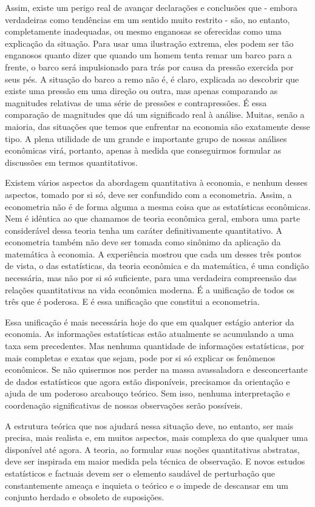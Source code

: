 \documentclass[12pt]{article}
\begin{document}
Assim, existe um perigo real de avançar declarações e conclusões que - embora verdadeiras como tendências em um sentido muito restrito - são, no entanto, completamente inadequadas, ou mesmo enganosas se oferecidas como uma explicação da situação. Para usar uma ilustração extrema, eles podem ser tão enganosos quanto dizer que quando um homem tenta remar um barco para a frente, o barco será impulsionado para trás por causa da pressão exercida por seus pés. A situação do barco a remo não é, é claro, explicada ao descobrir que existe uma pressão em uma direção ou outra, mas apenas comparando as magnitudes relativas de uma série de pressões e contrapressões. É essa comparação de magnitudes que dá um significado real à análise. Muitas, senão a maioria, das situações que temos que enfrentar na economia são exatamente desse tipo. A plena utilidade de um grande e importante grupo de nossas análises econômicas virá, portanto, apenas à medida que conseguirmos formular as discussões em termos quantitativos.

Existem vários aspectos da abordagem quantitativa à economia, e nenhum desses aspectos, tomado por si só, deve ser confundido com a econometria. Assim, a econometria não é de forma alguma a mesma coisa que as estatísticas econômicas. Nem é idêntica ao que chamamos de teoria econômica geral, embora uma parte considerável dessa teoria tenha um caráter definitivamente quantitativo. A econometria também não deve ser tomada como sinônimo da aplicação da matemática à economia. A experiência mostrou que cada um desses três pontos de vista, o das estatísticas, da teoria econômica e da matemática, é uma condição necessária, mas não por si só suficiente, para uma verdadeira compreensão das relações quantitativas na vida econômica moderna. É a unificação de todos os três que é poderosa. E é essa unificação que constitui a econometria.

Essa unificação é mais necessária hoje do que em qualquer estágio anterior da economia. As informações estatísticas estão atualmente se acumulando a uma taxa sem precedentes. Mas nenhuma quantidade de informações estatísticas, por mais completas e exatas que sejam, pode por si só explicar os fenômenos econômicos. Se não quisermos nos perder na massa avassaladora e desconcertante de dados estatísticos que agora estão disponíveis, precisamos da orientação e ajuda de um poderoso arcabouço teórico. Sem isso, nenhuma interpretação e coordenação significativas de nossas observações serão possíveis.

A estrutura teórica que nos ajudará nessa situação deve, no entanto, ser mais precisa, mais realista e, em muitos aspectos, mais complexa do que qualquer uma disponível até agora. A teoria, ao formular suas noções quantitativas abstratas, deve ser inspirada em maior medida pela técnica de observação. E novos estudos estatísticos e factuais devem ser o elemento saudável de perturbação que constantemente ameaça e inquieta o teórico e o impede de descansar em um conjunto herdado e obsoleto de suposições.
\end{document}
